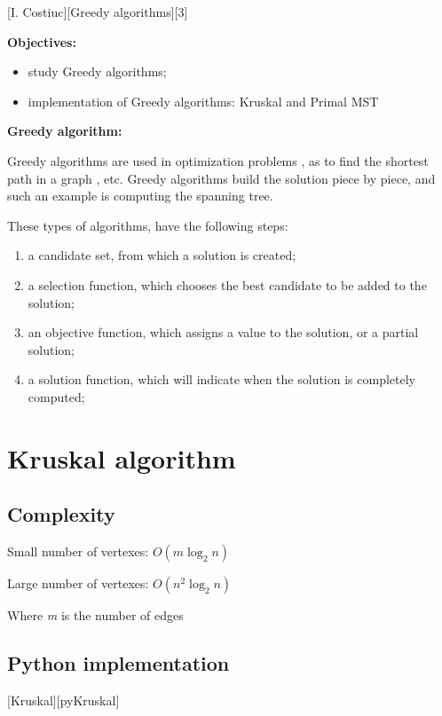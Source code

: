 \documentclass{article}
\begin{document}
	\def \reportSubj{Greedy algorithms}
	[I. Costiuc][\reportSubj][3]

	{\Large \textbf{Objectives:}}
	\begin{itemize}
		\item study Greedy algorithms;
		\item implementation of Greedy algorithms: Kruskal and Primal MST
	\end{itemize}

	{\Large \textbf{Greedy algorithm:}}
	\par Greedy algorithms are used in optimization problems , as to find the shortest path in a graph , etc. Greedy algorithms build the solution piece by piece, and such an example is computing the spanning tree.

	\par These types of algorithms, have the following steps:
	\begin{enumerate}
		\item a candidate set, from which a solution is created;
		\item a selection function, which chooses the best candidate to be added to the solution;
		\item an objective function, which assigns a value to the solution, or a partial solution;
		\item a solution function, which will indicate when the solution is completely computed;
	\end{enumerate}

	\newpage
	\section{Kruskal algorithm}
		\subsection{Complexity}
		\begin{center}
			\par Small number of vertexes: \( O(m \log_2 n) \)
			\par Large number of vertexes: \( O(n^2 \log_2 n) \)
			\par Where \textit{m} is the number of edges
		\end{center}

		\subsection{Python implementation}
		[Kruskal][pyKruskal]
\end{document}
